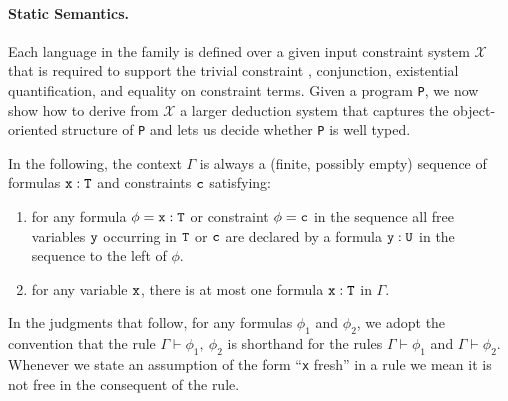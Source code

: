 \paragraph{Static Semantics.}
Each language in the family is defined over a given input constraint system $\mathcal{X}$ that is required to support the trivial constraint \true{}, conjunction, existential quantification, and equality on constraint terms. Given a program {\tt P}, we now show how to derive from $\mathcal{X}$ a larger deduction system that captures the object-oriented structure of {\tt P} and lets us decide whether {\tt P} is well typed.

In the following, the context $\Gamma$ is always a
(finite, possibly empty) sequence of formulas $\tt x:T$ and constraints $\tt c$ satisfying:
\begin{enumerate}
  \item for any formula $\phi=\tt x:T$ or constraint $\phi=\tt c$ in the sequence all free variables $\tt y$
  occurring in $\tt T$ or $\tt c$ are declared by a formula $\tt
  y:U$ in the sequence to the left of $\phi$.

  \item for any variable $\tt x$, there is at most one
  formula $\tt x:T$ in $\Gamma$.
\end{enumerate}

\medskip

In the judgments that follow, 
for any formulas $\phi_1$ and
$\phi_2$, we adopt the convention that the rule $\Gamma \vdash \phi_1,~\phi_2$
is shorthand for the rules
$\Gamma \vdash \phi_1$
and
$\Gamma \vdash \phi_2$. Whenever
we state an assumption of the form ``{\tt x} fresh'' in a rule we mean
it is not free in the consequent of the rule.

